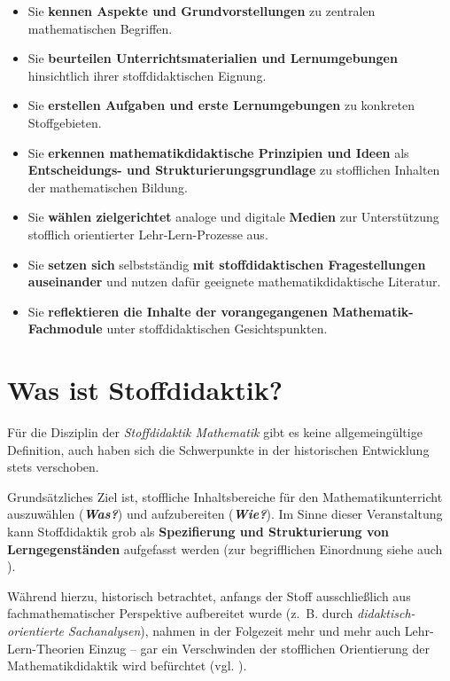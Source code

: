 \documentclass[
]{scrbook}
\providecommand{\tightlist}{%
  \setlength{\itemsep}{0pt}\setlength{\parskip}{0pt}}
\theoremstyle{definition}
\theoremstyle{definition}
\theoremstyle{definition}
\theoremstyle{definition}
\theoremstyle{remark}
\begin{document}
\begin{itemize}
\tightlist
\item
  Sie \textbf{kennen Aspekte und Grundvorstellungen} zu zentralen mathematischen Begriffen.
\item
  Sie \textbf{beurteilen Unterrichtsmaterialien und Lernumgebungen} hinsichtlich ihrer stoffdidaktischen Eignung.
\item
  Sie \textbf{erstellen Aufgaben und erste Lernumgebungen} zu konkreten Stoffgebieten.
\item
  Sie \textbf{erkennen mathematikdidaktische Prinzipien und Ideen} als \textbf{Entscheidungs- und Strukturierungsgrundlage} zu stofflichen Inhalten der mathematischen Bildung.
\item
  Sie \textbf{wählen zielgerichtet} analoge und digitale \textbf{Medien} zur Unterstützung stofflich orientierter Lehr-Lern-Prozesse aus.
\item
  Sie \textbf{setzen sich} selbstständig \textbf{mit stoffdidaktischen Fragestellungen auseinander} und nutzen dafür geeignete mathematikdidaktische Literatur.
\item
  Sie \textbf{reflektieren die Inhalte der vorangegangenen Mathematik-Fachmodule} unter stoffdidaktischen Gesichtspunkten.
\end{itemize}

\section*{Was ist Stoffdidaktik?}\label{was-ist-stoffdidaktik}

Für die Disziplin der \emph{Stoffdidaktik Mathematik} gibt es keine allgemeingültige Definition, auch haben sich die Schwerpunkte in der historischen Entwicklung stets verschoben.

Grundsätzliches Ziel ist, stoffliche Inhaltsbereiche für den Mathematikunterricht auszuwählen (\textbf{\emph{Was?}}) und aufzubereiten (\textbf{\emph{Wie?}}). Im Sinne dieser Veranstaltung kann Stoffdidaktik grob als \textbf{Spezifierung und Strukturierung von Lerngegenständen} aufgefasst werden (zur begrifflichen Einordnung siehe auch ).

Während hierzu, historisch betrachtet, anfangs der Stoff ausschließlich aus fachmathematischer Perspektive aufbereitet wurde (z.~B. durch \emph{didaktisch-orientierte Sachanalysen}), nahmen in der Folgezeit mehr und mehr auch Lehr-Lern-Theorien Einzug -- gar ein Verschwinden der stofflichen Orientierung der Mathematikdidaktik wird befürchtet (vgl. ).
\end{document}
